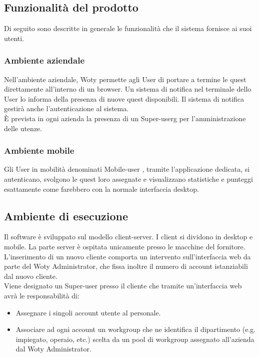 \subsection{Funzionalità del prodotto}

Di seguito sono descritte in generale le funzionalità che il sistema fornisce ai suoi utenti.\\

\subsubsection{Ambiente aziendale}
Nell’ambiente aziendale, Woty permette agli User di portare a termine le quest direttamente all’interno di un browser. Un sistema di notifica nel terminale dello User lo informa della presenza di nuove quest disponibili. Il sistema di notifica gestirà anche l’autenticazione al sistema.\\ 
È prevista in ogni azienda la presenza di un Super-userg per l’amministrazione delle utenze.\\


\subsubsection{Ambiente mobile}
Gli User in mobilità denominati Mobile-user , tramite l’applicazione dedicata, si autenticano, svolgono le quest loro assegnate e visualizzano statistiche e punteggi esattamente come farebbero con la normale interfaccia desktop.

\subsection{Ambiente di esecuzione}

Il software è sviluppato sul modello client-server. I client si dividono in desktop e mobile. La parte server è ospitata unicamente presso le macchine del fornitore.\\
L’inserimento di un nuovo cliente comporta un intervento sull’interfaccia web da parte del Woty Administrator, che fissa inoltre il numero di account istanziabili dal nuovo cliente.\\
Viene designato un Super-user presso il cliente che tramite un’interfaccia web avrà le responsabilità di:
\begin{itemize}
\item{ Assegnare i singoli account utente al personale. }
\item{ Associare ad ogni account un workgroup che ne identifica il dipartimento (e.g. impiegato, operaio, etc.) scelta da un pool di workgroup assegnato all’azienda dal Woty Administrator. }
\end{itemize}


